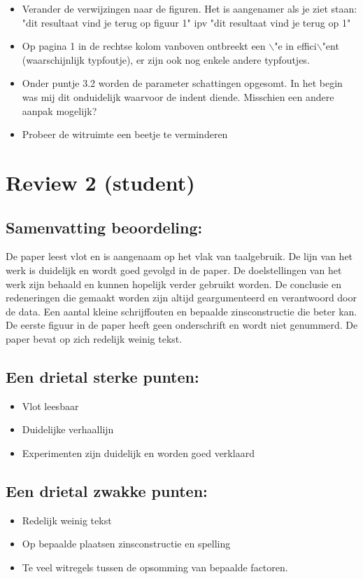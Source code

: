 \documentclass[11pt]{article}
\begin{document}
\begin{itemize}
\item Verander de verwijzingen naar de figuren. Het is aangenamer als je ziet staan: "dit resultaat vind je terug op figuur 1" ipv "dit resultaat vind je terug op 1"
\item Op pagina 1 in de rechtse kolom vanboven ontbreekt een $\backslash$"e in effici$\backslash$"ent (waarschijnlijk typfoutje), er zijn ook nog enkele andere typfoutjes.

\item Onder puntje 3.2 worden de parameter schattingen opgesomt. In het begin was mij dit onduidelijk waarvoor de indent diende. Misschien een andere aanpak mogelijk?
\item Probeer de witruimte een beetje te verminderen
\end{itemize}

\section{Review 2 (student)}
\subsection{Samenvatting beoordeling:}
De paper leest vlot en is aangenaam op het vlak van taalgebruik. De lijn van het werk is duidelijk en wordt goed gevolgd in de paper. De doelstellingen van het werk zijn behaald en kunnen hopelijk verder gebruikt worden. De conclusie en redeneringen die gemaakt worden zijn altijd geargumenteerd en verantwoord door de data. Een aantal kleine schrijffouten en bepaalde zinsconstructie die beter kan. De eerste figuur in de paper heeft geen onderschrift en wordt niet genummerd. De paper bevat op zich redelijk weinig tekst.

\subsection{Een drietal sterke punten:}
\begin{itemize}
\item Vlot leesbaar
\item Duidelijke verhaallijn
\item Experimenten zijn duidelijk en worden goed verklaard
\end{itemize}

\subsection{Een drietal zwakke punten:}
\begin{itemize}
\item Redelijk weinig tekst
\item Op bepaalde plaatsen zinsconstructie en spelling
\item Te veel witregels tussen de opsomming van bepaalde factoren.
\end{itemize}
\end{document}

